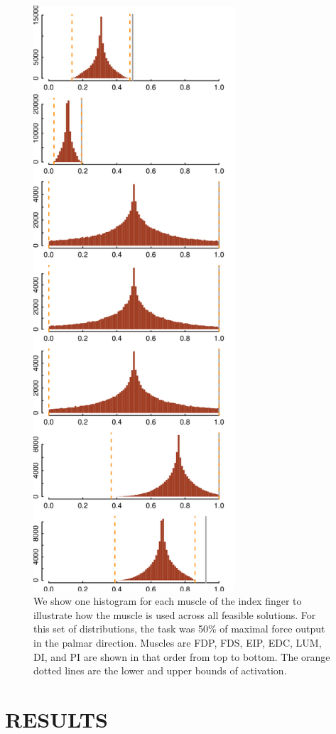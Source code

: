 \begin{figure}[htbp]
\centering
\includegraphics[width=7.5cm]{sections/figs/raw_histograms.png}
\caption{We show one histogram for each muscle of the index finger to illustrate how the muscle is used across all feasible solutions.
For this set of distributions, the task was 50\% of maximal force output in the palmar direction. Muscles are FDP, FDS, EIP, EDC, LUM, DI, and PI are shown in that order from top to bottom. The orange dotted lines are the lower and upper bounds of activation.}
\label{fig:raw_histograms}
\end{figure}


\section{RESULTS}

